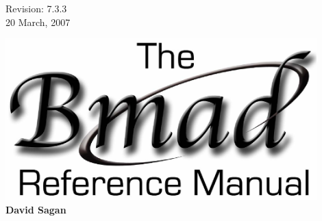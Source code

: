 \thispagestyle{empty}

\begin{flushright}
\large
  Revision: 7.3.3 \\
  20 March, 2007 \\
\end{flushright}

\vfill

{
\begin{center}
\includegraphics[width=12cm]{bmad-ref-manual.eps} \\
\vskip 0.3in
\huge\bf David Sagan
\end{center}
}

\vfill
\break
